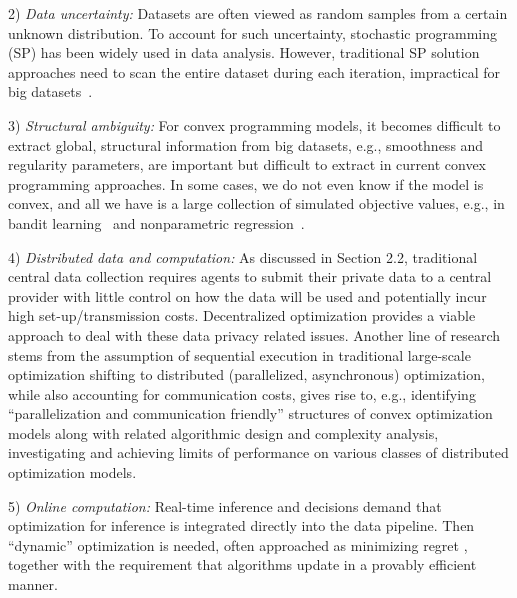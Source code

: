 \documentclass[12pt]{article}
\begin{document}
2) {\it Data uncertainty:} Datasets are often viewed as random samples from a
certain unknown distribution. To account for such uncertainty, stochastic programming (SP) has been
widely used in data analysis. However, traditional SP solution approaches need to scan the entire dataset during each iteration, impractical for big datasets~\cite{UCI12}.
%

3) {\it Structural ambiguity:}
For convex programming models, it becomes difficult to extract
global, structural information from big datasets, e.g., smoothness and regularity parameters, are important but difficult
to extract in current convex programming approaches.
In some cases, we do not even know if the model is convex, and all
we have is a large collection of simulated objective values,
e.g., in bandit learning~\cite{BerVal08-1} and nonparametric regression~\cite{Dippon03-1}.

4) {\it Distributed data and computation:} As discussed in Section 2.2, traditional
central data collection requires agents to submit their private data to
a central provider with little control on how the data will be used and potentially
incur high set-up/transmission costs. Decentralized optimization provides a viable
approach to deal with these data privacy related issues.
Another line of research stems from the assumption of sequential execution in
traditional  large-scale optimization shifting to distributed (parallelized, asynchronous) optimization, while also accounting for communication costs, gives rise to, e.g.,  identifying ``parallelization and communication friendly'' structures of convex optimization models along with related algorithmic design and complexity analysis, investigating and achieving limits of performance on various classes of distributed optimization models.

5) {\it Online computation:} Real-time inference and decisions demand that  optimization for inference is integrated directly into the data pipeline. Then ``dynamic'' optimization is needed,  often approached as minimizing regret  \cite{hazan15in,shalevshwartz11on}, together with the requirement that algorithms update in a provably efficient manner.
\end{document}

